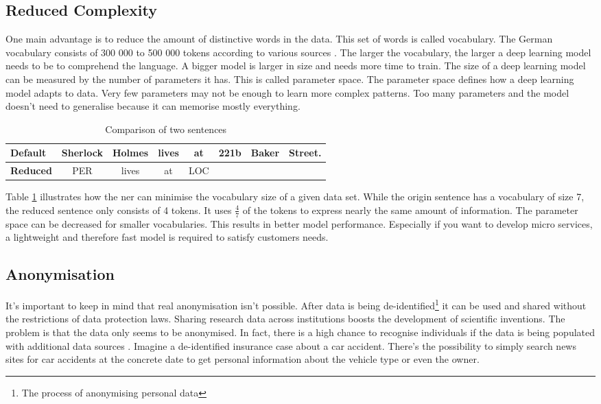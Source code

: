 \subsection{Reduced Complexity}

One main advantage is to reduce the amount of distinctive words in the data. This set of words is called vocabulary. The German vocabulary consists of 300 000 to 500 000 tokens according to various sources \cite{wiki03}. The larger the vocabulary, the larger a deep learning model needs to be to comprehend the language. A bigger model is larger in size and needs more time to train. The size of a deep learning model can be measured by the number of parameters it has. This is called parameter space. The parameter space defines how a deep learning model adapts to data. Very few parameters may not be enough to learn more complex patterns. Too many parameters and the model doesn't need to generalise because it can memorise mostly everything.

\begin{table}[h!]
    \centering
    \begin{tabular}{|l|c|c|c|c|c|c|c|}
        \hline
        \textbf{Default} & Sherlock & Holmes & lives & at & 221b & Baker & Street. \\
        \hline
        \textbf{Reduced} & PER & lives & at & LOC & & & \\
        \hline
    \end{tabular}
    \caption{Comparison of two sentences}
    \label{tbl:param-space}
\end{table}

Table \ref{tbl:param-space} illustrates how the \acrshort{ner} can minimise the vocabulary size of a given data set. While the origin sentence has a vocabulary of size 7, the reduced sentence only consists of 4 tokens. It uses $\frac{4}{7}$ of the tokens to express nearly the same amount of information. The parameter space can be decreased for smaller vocabularies. This results in better model performance. Especially if you want to develop micro services, a lightweight and therefore fast model is required to satisfy customers needs.

\subsection{Anonymisation}

It's important to keep in mind that real anonymisation isn't possible. After data is being de-identified\footnote{The process of anonymising personal data} it can be used and shared without the restrictions of data protection laws. Sharing research data across institutions boosts the development of scientific inventions. The problem is that the data only seems to be anonymised. In fact, there is a high chance to recognise individuals if the data is being populated with additional data sources \cite{rocher19}. Imagine a de-identified insurance case about a car accident. There's the possibility to simply search news sites for car accidents at the concrete date to get personal information about the vehicle type or even the owner.

